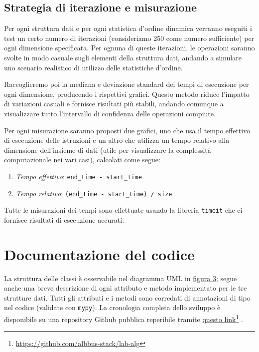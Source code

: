 \documentclass[onecolumn]{article}
\newcommand\anchor[2]{%
  \href{#2}{#1}\footnote{\url{#2}}%
}
\begin{document}
\subsection{Strategia di iterazione e misurazione}

Per ogni struttura dati e per ogni statistica d'ordine dinamica verranno eseguiti i test un certo numero di iterazioni (consideriamo 250 come numero sufficiente) per ogni dimensione specificata. Per ognuna di queste iterazioni, le operazioni saranno svolte in modo casuale sugli elementi della struttura dati, andando a simulare uno scenario realistico di utilizzo delle statistiche d'ordine. 

Raccoglieremo poi la mediana e deviazione standard dei tempi di esecuzione per ogni dimensione, producendo i rispettivi grafici. Questo metodo riduce l'impatto di variazioni casuali e fornisce risultati più stabili, andando comunque a visualizzare tutto l'intervallo di confidenza delle operazioni compiute.

Per ogni misurazione saranno proposti due grafici, uno che usa il tempo effettivo di esecuzione delle istruzioni e un altro che utilizza un tempo relativo alla dimensione dell'insieme di dati (utile per visualizzare la complessità computazionale nei vari casi), calcolati come segue:
\begin{enumerate}
	\setlength\itemsep{-0.25em}
	\item \textit{Tempo effettivo}: \verb|end_time - start_time|
	\item \textit{Tempo relativo}: \verb|(end_time - start_time) / size|
\end{enumerate}

Tutte le misurazioni dei tempi sono effettuate usando la libreria \verb|timeit| che ci fornisce risultati di esecuzione accurati.

\newpage
\section{Documentazione del codice}

La struttura delle classi è osservabile nel diagramma UML in \hyperref[fig:classi]{figura 3}; segue anche una breve descrizione di ogni attributo e metodo implementato per le tre strutture dati. Tutti gli attributi e i metodi sono corredati di annotazioni di tipo nel codice (validate con \verb|mypy|). La cronologia completa dello sviluppo è disponibile su una repository Github pubblica reperibile tramite \anchor{questo link}{https://github.com/albbus-stack/lab-alg}. 
\end{document}
